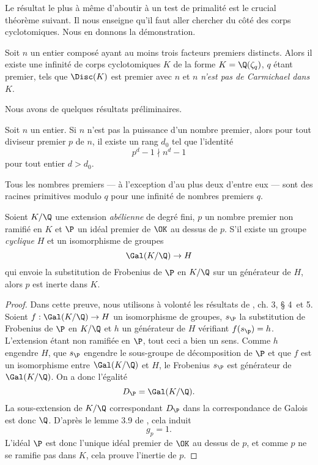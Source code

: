 Le résultat le plus à même d'aboutir à un test de primalité est le crucial théorème suivant. Il nous enseigne qu'il faut aller chercher du côté des corps cyclotomiques. Nous en donnons la démonstration.

\begin{theoreme}\label{theoreme-3.6}
	Soit $n$ un entier composé ayant au moins trois facteurs premiers distincts. Alors il existe une infinité de corps cyclotomiques $K$ de la forme $K = \Q(\zeta_q)$, $q$ étant premier, tels que $\Disc(K)$ est premier avec $n$ et $n$ \emph{n'est pas de Carmichael dans $K$}.
\end{theoreme}

Nous avons de quelques résultats préliminaires.

\begin{lemme}\label{lemme-3.3}
	Soit $n$ un entier. Si $n$ n'est pas la puissance d'un nombre premier, alors pour tout diviseur premier $p$ de $n$, il existe un rang $d_0$ tel que l'identité \[p^d - 1 \nmid n^d - 1\] pour tout entier $d> d_0$.
\end{lemme}

\begin{lemme}
	Tous les nombres premiers — à l'exception d'au plus deux d'entre eux — sont des racines primitives modulo $q$ pour une infinité de nombres premiers $q$.
\end{lemme}

\begin{lemme}\label{lemme-inerte}
	Soient $K/\Q$ une extension \emph{abélienne} de degré fini, $p$ un nombre premier non ramifié en $K$ et $\P$ un idéal premier de $\OK$ au dessus de $p$. S'il existe un groupe \emph{cyclique} $H$ et un isomorphisme de groupes \[\Gal(K/\Q) \to H\] qui envoie la substitution de Frobenius de $\P$ en $K/\Q$ sur un générateur de $H$, alors $p$ est inerte dans $K$.
\end{lemme}

\begin{proof}
	Dans cette preuve, nous utilisons à volonté les résultats de \cite{Kraus}, ch. 3, § 4 et 5. Soient $f : \Gal(K/\Q) \to H$ un isomorphisme de groupes, $s_\P$ la substitution de Frobenius de $\P$ en $K/\Q$ et $h$ un générateur de $H$ vérifiant $f(s_\p) = h$. L'extension étant non ramifiée en $\P$, tout ceci a bien un sens. Comme $h$ engendre $H$, que $s_\P$ engendre le sous-groupe de décomposition de $\P$ et que $f$ est un isomorphisme entre $\Gal(K/\Q)$ et $H$, le Frobenius $s_\P$ est générateur de $\Gal(K/\Q)$. On a donc l'égalité \[D_\P = \Gal(K/\Q).\] La sous-extension de $K/\Q$ correspondant $D_\P$ dans la correspondance de Galois est donc $\Q$. D'après le lemme 3.9 de \cite{Kraus}, cela induit \[g_p = 1.\] L'idéal $\P$ est donc l'unique idéal premier de $\OK$ au dessus de $p$, et comme $p$ ne se ramifie pas dans $K$, cela prouve l'inertie de $p$.

\end{proof}

